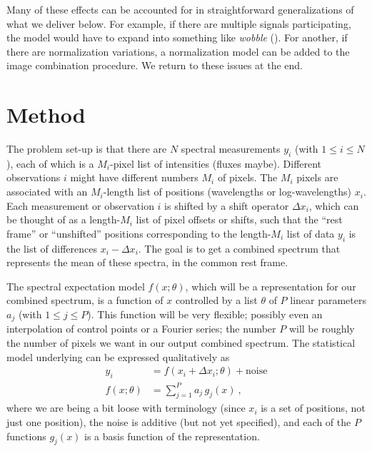 \documentclass[modern]{aastex631}
\begin{document}
Many of these effects can be accounted for in straightforward generalizations of what we deliver below.
For example, if there are multiple signals participating, the model would have to expand into something like \textsl{wobble} (\citealt{wobble}).
For another, if there are normalization variations, a normalization model can be added to the image combination procedure.
We return to these issues at the end. %

\section{Method}\label{sec:method}

The problem set-up is that there are $N$ spectral measurements $y_i$ (with $1\leq i\leq N$), each of which is a $M_i$-pixel list of intensities (fluxes maybe).
Different observations $i$ might have different numbers $M_i$ of pixels.
The $M_i$ pixels are associated with an $M_i$-length list of positions (wavelengths or log-wavelengths) $x_i$.
Each measurement or observation $i$ is shifted by a shift operator $\Delta x_i$, which can be thought of as a length-$M_i$ list of pixel offsets or shifts, such that the ``rest frame'' or ``unshifted'' positions corresponding to the length-$M_i$ list of data $y_i$ is the list of differences $x_i - \Delta x_i$.
The goal is to get a combined spectrum that represents the mean of these spectra, in the common rest frame.

The spectral expectation model $f(x;\theta)$, which will be a representation for our combined spectrum, is a function of $x$ controlled by a list $\theta$ of $P$ linear parameters $a_j$ (with $1\leq j\leq P$).
This function will be very flexible; possibly even an interpolation of control points or a Fourier series; the number $P$ will be roughly the number of pixels we want in our output combined spectrum.
The statistical model underlying can be expressed qualitatively as
\begin{align}
    y_i &= f(x_i + \Delta x_i;\theta) + \mbox{noise} \\
    f(x;\theta) &= \sum_{j=1}^P a_j\,g_j(x) ~,
\end{align}
where we are being a bit loose with terminology (since $x_i$ is a set of positions, not just one position), the noise is additive (but not yet specified), and each of the $P$ functions $g_j(x)$ is a basis function of the representation.
\end{document}
